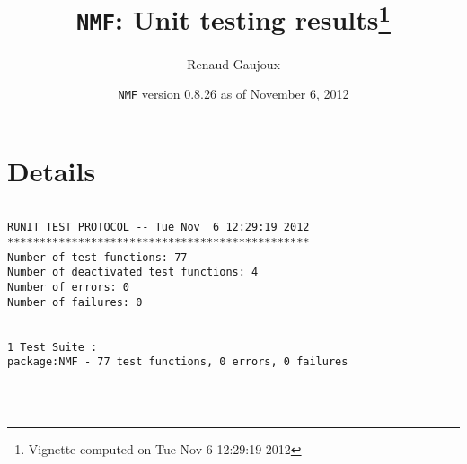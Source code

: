 \documentclass[10pt]{article}
\author{Renaud Gaujoux}
\title{\texttt{NMF}: Unit testing results\footnote{Vignette computed  on Tue Nov  6 12:29:19 2012}}
\date{\texttt{NMF} version 0.8.26 as of November  6, 2012}
\begin{document}
\maketitle

\section{Details}
\begin{verbatim}

RUNIT TEST PROTOCOL -- Tue Nov  6 12:29:19 2012 
*********************************************** 
Number of test functions: 77 
Number of deactivated test functions: 4 
Number of errors: 0 
Number of failures: 0 

 
1 Test Suite : 
package:NMF - 77 test functions, 0 errors, 0 failures




\end{verbatim}
\end{document}
